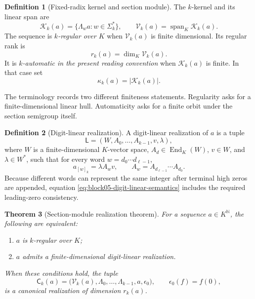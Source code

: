 \documentclass[11pt]{article}
\newtheorem{theorem}{Theorem}[section]
\theoremstyle{definition}
\newtheorem{definition}[theorem]{Definition}
\theoremstyle{remark}
\DeclareMathOperator{\Span}{span}
\DeclareMathOperator{\End}{End}
\begin{document}
\begin{definition}[Fixed-radix kernel and section module]
The \(k\)-kernel and its linear span are
\[
\mathcal K_k(a)
=
\{\Lambda_w a:w\in\Sigma_k^*\},
\qquad
\mathcal V_k(a)
=
\Span_K\mathcal K_k(a).
\]
The sequence is \emph{\(k\)-regular over \(K\)} when \(\mathcal V_k(a)\) is finite dimensional.  Its regular rank is
\[
r_k(a)=\dim_K\mathcal V_k(a).
\]
It is \emph{\(k\)-automatic in the present reading convention} when \(\mathcal K_k(a)\) is finite.  In that case set
\[
\kappa_k(a)=|\mathcal K_k(a)|.
\]
\end{definition}

The terminology records two different finiteness statements.  Regularity asks for a finite-dimensional linear hull.  Automaticity asks for a finite orbit under the section semigroup itself.

\begin{definition}[Digit-linear realization]
A digit-linear realization of \(a\) is a tuple
\[
\mathsf L=(W,A_0,\ldots,A_{k-1},v,\lambda),
\]
where \(W\) is a finite-dimensional \(K\)-vector space, \(A_d\in\End_K(W)\), \(v\in W\), and \(\lambda\in W^*\), such that for every word \(w=d_0\cdots d_{\ell-1}\),
\begin{equation}
a_{[w]_k}
=
\lambda A_wv,
\qquad
A_w=A_{d_{\ell-1}}\cdots A_{d_0}.
\label{eq:block05-digit-linear-semantics}
\end{equation}
Because different words can represent the same integer after terminal high zeros are appended, equation \eqref{eq:block05-digit-linear-semantics} includes the required leading-zero consistency.
\end{definition}

\begin{theorem}[Section-module realization theorem]
\label{thm:block05-section-module-realization}
For a sequence \(a\in K^{\mathbb N}\), the following are equivalent:
\begin{enumerate}
\item \(a\) is \(k\)-regular over \(K\);
\item \(a\) admits a finite-dimensional digit-linear realization.
\end{enumerate}
When these conditions hold, the tuple
\begin{equation}
\mathsf C_k(a)
=
\bigl(
\mathcal V_k(a),
\Lambda_0,\ldots,\Lambda_{k-1},
 a,
\epsilon_0
\bigr),
\qquad
\epsilon_0(f)=f(0),
\label{eq:block05-canonical-section-module}
\end{equation}
is a canonical realization of dimension \(r_k(a)\).
\end{theorem}
\end{document}
